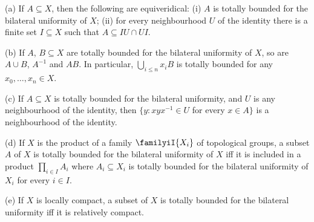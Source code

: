 (a) If $A\subseteq X$, then the following are equiveridical:  (i) $A$ is
totally bounded for the bilateral uniformity of $X$;  (ii) for every
neighbourhood $U$ of the identity there is a finite set $I\subseteq X$
such that $A\subseteq IU\cap UI$.

(b) If $A$, $B\subseteq X$ are totally bounded for the bilateral
uniformity of $X$, so are $A\cup B$, $A^{-1}$ and $AB$.   In particular,
$\bigcup_{i\le n}x_iB$ is totally bounded for any $x_0,\ldots,x_n\in X$.

(c) If $A\subseteq X$ is totally bounded for the bilateral uniformity,
and $U$ is any neighbourhood of the identity, then
$\{y:xyx^{-1}\in U$ for every $x\in A\}$ is a neighbourhood of the
identity.

(d) If $X$ is the product of a family $\familyiI{X_i}$ of
topological groups, a subset $A$ of $X$ is totally bounded for the
bilateral uniformity of $X$ iff it is included in a product
$\prod_{i\in I}A_i$ where $A_i\subseteq X_i$ is totally bounded for the
bilateral uniformity of $X_i$ for every $i\in I$.

(e) If $X$ is locally compact, a subset of $X$ is totally bounded for
the bilateral uniformity iff it is relatively compact.

